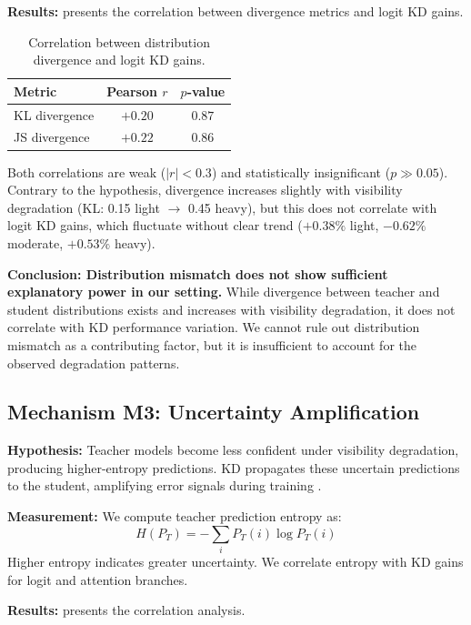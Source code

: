 \textbf{Results:}  presents the correlation between divergence metrics and logit KD gains.

\begin{table}[htbp]
\centering
\caption{Correlation between distribution divergence and logit KD gains.}
\label{tab:divergence_corr}
\begin{tabular}{@{}lcc@{}}
\toprule
Metric & Pearson $r$ & $p$-value \\
\midrule
KL divergence & $+0.20$ & $0.87$ \\
JS divergence & $+0.22$ & $0.86$ \\
\bottomrule
\end{tabular}
\end{table}

Both correlations are weak ($|r| < 0.3$) and statistically insignificant ($p \gg 0.05$). Contrary to the hypothesis, divergence increases slightly with visibility degradation (KL: 0.15 light $\to$ 0.45 heavy), but this does not correlate with logit KD gains, which fluctuate without clear trend ($+0.38\%$ light, $-0.62\%$ moderate, $+0.53\%$ heavy).

\textbf{Conclusion: Distribution mismatch does not show sufficient explanatory power in our setting.} While divergence between teacher and student distributions exists and increases with visibility degradation, it does not correlate with KD performance variation. We cannot rule out distribution mismatch as a contributing factor, but it is insufficient to account for the observed degradation patterns.

\subsection{Mechanism M3: Uncertainty Amplification}

\textbf{Hypothesis:} Teacher models become less confident under visibility degradation, producing higher-entropy predictions. KD propagates these uncertain predictions to the student, amplifying error signals during training \cite{kendall2017uncertainties}.

\textbf{Measurement:} We compute teacher prediction entropy as:
\begin{equation}
H(P_T) = -\sum_i P_T(i) \log P_T(i)
\end{equation}
Higher entropy indicates greater uncertainty. We correlate entropy with KD gains for logit and attention branches.

\textbf{Results:}  presents the correlation analysis.


